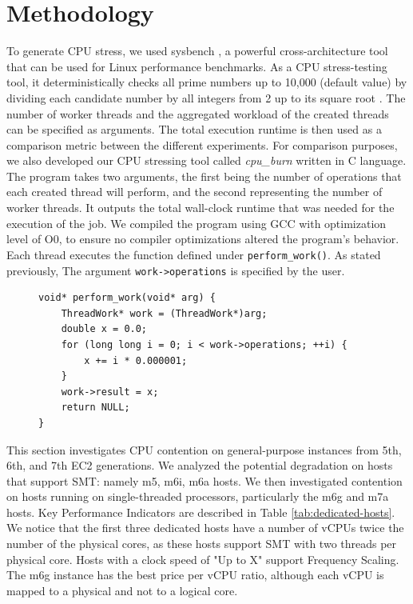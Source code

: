 \section{Methodology}
To generate CPU stress, we used sysbench \cite{sysbench}, a powerful cross-architecture tool
that can be used for Linux performance benchmarks. As a CPU stress-testing tool, it deterministically 
checks all prime numbers up to 10,000 (default value) by dividing each candidate number by all integers 
from 2 up to its square root \cite{gentoo_sysbench}. The number of worker threads 
and the aggregated workload of the created threads can be specified as arguments. 
The total execution runtime is then used as a comparison metric 
between the different experiments. For comparison purposes, we also developed our CPU stressing 
tool called \textit{cpu\_burn} written in C language. The program takes two arguments, the first 
being the number of operations that each created thread will perform, and the second representing 
the number of worker threads. It outputs the total wall-clock runtime that was needed for the 
execution of the job. 
We compiled the program using GCC with optimization level of O0, to ensure no compiler optimizations
altered the program's behavior. Each thread executes the function defined under \texttt{perform\_work()}. 
As stated previously, The argument \texttt{work->operations} is specified by the user.

\begin{figure}[H]
\begin{lstlisting}[caption={Workload of the \textit{cpu\_burn} tool}]
void* perform_work(void* arg) {
    ThreadWork* work = (ThreadWork*)arg;
    double x = 0.0;
    for (long long i = 0; i < work->operations; ++i) {
        x += i * 0.000001;
    }
    work->result = x;
    return NULL;
}
\end{lstlisting}
\end{figure}
\noindent
This section investigates CPU contention on general-purpose instances from 5th, 6th, and 7th EC2 generations. 
We analyzed the potential degradation on hosts that support 
\acl{SMT}: namely m5, m6i, m6a hosts. We then investigated contention on hosts running on single-threaded 
processors, particularly the m6g and m7a hosts. 
Key Performance Indicators are described in Table \ref{tab:dedicated-hosts}. We notice that the first 
three dedicated hosts have a number of vCPUs 
twice the number of the physical cores, as these hosts support \ac{SMT} with 
two threads per physical core. Hosts with a clock speed of "Up to X" support 
Frequency Scaling. The m6g instance has the best price per vCPU ratio, although each 
vCPU is mapped to a physical and not to a logical core.

